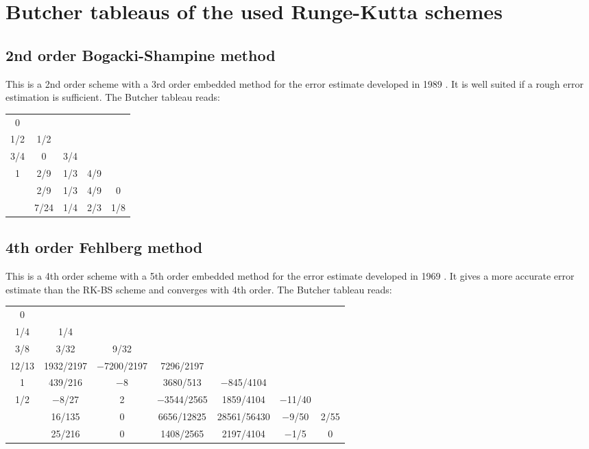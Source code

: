 	
\chapter{Butcher tableaus of the used Runge-Kutta schemes}
\label{apx:ButcherTableaus}

\section{2nd order Bogacki-Shampine method}
This is a 2nd order scheme with a 3rd order embedded method for the error estimate developed in 1989 \cite{RK-BogackiShampine}. It is well suited if a rough error estimation is sufficient. The Butcher tableau reads:
\begin{center}
	\begin{tabular}{c | c c c c}
		0 & & & & \\
		1/2 & 1/2 & & & \\
		3/4 & 0 & 3/4 & & \\
		1 & 2/9 & 1/3 & 4/9 & \\ \hline
		& 2/9 & 1/3 & 4/9 & 0 \\
		& 7/24 & 1/4 & 2/3 & 1/8
	\end{tabular}
\end{center}

\section{4th order Fehlberg method}
This is a 4th order scheme with a 5th order embedded method for the error estimate developed in 1969 \cite{RK-Fehlberg}. It gives a more accurate error estimate than the RK-BS scheme and converges with 4th order. The Butcher tableau reads:

\begin{center}
	\begin{tabular}{c | c c c c c c}
		0 & & & & & & \\
		1/4 & 1/4 & & & & & \\
		3/8 & 3/32 & 9/32 & & & &\\
		12/13 & 1932/2197 &	−7200/2197 & 7296/2197 & & & \\
		1 & 439/216 & −8 & 3680/513 & −845/4104 & & \\
		1/2 & −8/27 & 2 & −3544/2565 & 1859/4104 & −11/40 	& \\ \hline
		& 16/135 & 0 & 6656/12825 & 28561/56430 & −9/50 & 2/55 \\ 
		& 25/216 & 0 & 1408/2565 & 2197/4104 & −1/5 & 0 
	\end{tabular}
\end{center}


